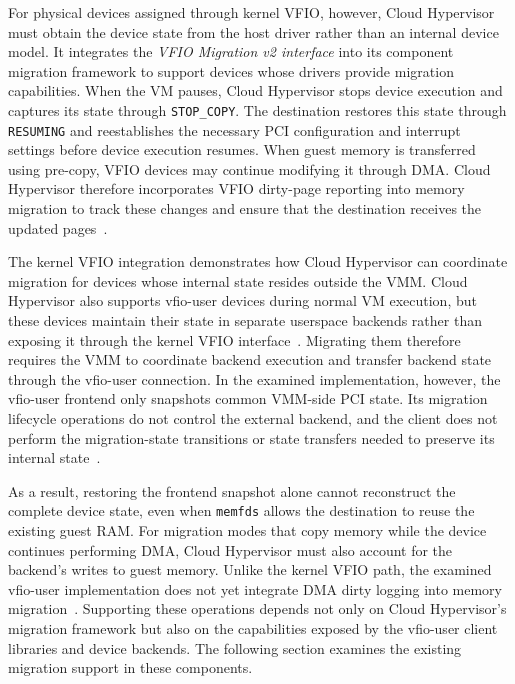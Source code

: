 For physical devices assigned through kernel VFIO, however, Cloud Hypervisor 
must obtain the device state from the host driver rather than an internal device 
model. It integrates the \emph{VFIO Migration v2 interface} into its component 
migration framework to support devices whose drivers provide migration 
capabilities. When the VM pauses, Cloud Hypervisor stops device execution and 
captures its state through \texttt{STOP\_COPY}. The destination restores this 
state through \texttt{RESUMING} and reestablishes the necessary PCI 
configuration and interrupt settings before device execution resumes. When 
guest memory is transferred using pre-copy, VFIO devices may continue modifying 
it through DMA. Cloud Hypervisor therefore incorporates VFIO dirty-page 
reporting into memory migration to track these changes and ensure that the 
destination receives the updated pages~\cite{cloud-hypervisor-vfio-migration}.

The kernel VFIO integration demonstrates how Cloud Hypervisor can coordinate 
migration for devices whose internal state resides outside the VMM. Cloud 
Hypervisor also supports vfio-user devices during normal VM execution, but 
these devices maintain their state in separate userspace backends rather than 
exposing it through the kernel VFIO interface~\cite{cloud-hypervisor-vfio-user}. 
Migrating them therefore requires the VMM to coordinate backend execution and 
transfer backend state through the vfio-user connection. In the examined 
implementation, however, the vfio-user frontend only snapshots common VMM-side 
PCI state. Its migration lifecycle operations do not control the external 
backend, and the client does not perform the migration-state transitions or 
state transfers needed to preserve its internal state~\cite{cloud-hypervisor-vfio-user-code,cloud-hypervisor-migration-framework}.

As a result, restoring the frontend snapshot alone cannot reconstruct the 
complete device state, even when \texttt{memfds} allows the destination to 
reuse the existing guest RAM. For migration modes that copy memory while the 
device continues performing DMA, Cloud Hypervisor must also account for the 
backend's writes to guest memory. Unlike the kernel VFIO path, the examined 
vfio-user implementation does not yet integrate DMA dirty logging into memory 
migration~\cite{cloud-hypervisor-vfio-user-code}. Supporting these operations 
depends not only on Cloud Hypervisor's migration framework but also on the 
capabilities exposed by the vfio-user client libraries and device backends. 
The following section examines the existing migration support in these components.

\cleardoublepage

